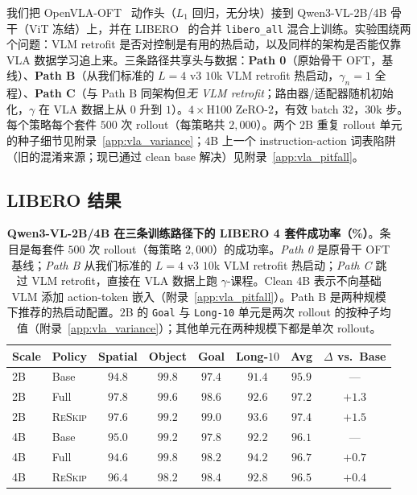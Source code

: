 \documentclass{article}
\newcommand{\reskip}{\textsc{ReSkip}}
\begin{document}
我们把 OpenVLA-OFT~\citep{kim2025openvlaoft} 动作头（$L_1$ 回归，无分块）接到 Qwen3-VL-2B/4B 骨干（ViT 冻结）上，并在 LIBERO~\citep{liu2023libero} 的合并 \texttt{libero\_all} 混合上训练。实验围绕两个问题：VLM retrofit 是否对控制是有用的热启动，以及同样的架构是否能仅靠 VLA 数据学习追上来。三条路径共享头与数据：\textbf{Path 0}（原始骨干 OFT，基线）、\textbf{Path B}（从我们标准的 $L{=}4$ v3 $10$k VLM retrofit 热启动，$\gamma_n{=}1$ 全程）、\textbf{Path C}（与 Path B 同架构但\emph{无 VLM retrofit}；路由器/适配器随机初始化，$\gamma$ 在 VLA 数据上从 $0$ 升到 $1$）。$4{\times}$H100 ZeRO-2，有效 batch $32$，$30$k 步。每个策略每个套件 $500$ 次 rollout（每策略共 $2{,}000$）。两个 $2$B 重复 rollout 单元的种子细节见附录~\ref{app:vla_variance}；$4$B 上一个 instruction-action 词表陷阱（旧的混淆来源；现已通过 clean base 解决）见附录~\ref{app:vla_pitfall}。

\subsection{LIBERO 结果}
\label{sec:vla_results}

\begin{table}[t]
\caption{\textbf{Qwen3-VL-2B/4B 在三条训练路径下的 LIBERO 4 套件成功率（\%）}。条目是每套件 $500$ 次 rollout（每策略 $2{,}000$）的成功率。\emph{Path 0} 是原骨干 OFT 基线；\emph{Path B} 从我们标准的 $L{=}4$ v3 $10$k VLM retrofit 热启动；\emph{Path C} 跳过 VLM retrofit，直接在 VLA 数据上跑 $\gamma$-课程。Clean 4B 表示不向基础 VLM 添加 action-token 嵌入（附录~\ref{app:vla_pitfall}）。Path B 是两种规模下推荐的热启动配置。$2$B 的 \texttt{Goal} 与 \texttt{Long-10} 单元是两次 rollout 的按种子均值（附录~\ref{app:vla_variance}）；其他单元在两种规模下都是单次 rollout。}
\label{tab:vla_libero}
\centering\small
\setlength{\tabcolsep}{4pt}
\begin{tabular}{llcccccc}
\toprule
Scale & Policy & Spatial & Object & Goal & Long-$10$ & \textbf{Avg} & $\Delta$ vs.\ Base \\
\midrule
2B & Base               & $94.8$ & $99.8$ & $97.4$ & $91.4$ & $95.9$ & --- \\
2B & Full               & $\mathbf{97.8}$ & $99.6$ & $98.6$ & $92.6$ & $97.2$ & $\mathbf{+1.3}$ \\
2B & \reskip{}          & $97.6$ & $99.2$ & $\mathbf{99.0}$ & $\mathbf{93.6}$ & $\mathbf{97.4}$ & $\mathbf{+1.5}$ \\
\midrule
4B & Base               & $95.0$ & $99.2$ & $97.8$ & $92.2$ & $96.1$ & --- \\
4B & Full               & $94.6$ & $\mathbf{99.8}$ & $98.2$ & $\mathbf{94.2}$ & $\mathbf{96.7}$ & $\mathbf{+0.7}$ \\
4B & \reskip{}          & $\mathbf{96.4}$ & $98.2$ & $\mathbf{98.4}$ & $92.8$ & $96.5$ & $+0.4$ \\
\bottomrule
\end{tabular}
\end{table}
\end{document}
